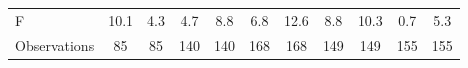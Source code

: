 {\begin{tabular}{l*{10}{c}}
F                   &        10.1         &         4.3         &         4.7         &         8.8         &         6.8         &        12.6         &         8.8         &        10.3         &         0.7         &         5.3         \\
Observations        &          85         &          85         &         140         &         140         &         168         &         168         &         149         &         149         &         155         &         155         \\
\end{tabular}
}
